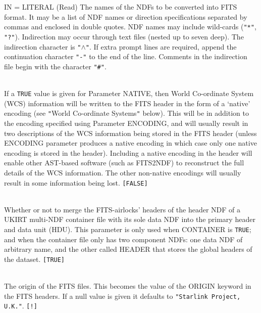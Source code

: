 \documentclass[twoside,11pt]{article}
\newcommand{\htmlref}[2]{#1}
\newcommand{\xref}[3]{#1}
\newcommand{\dqt}[1]{{\texttt{"#1"}}}
\newcommand{\hash}{\dqt{\#}}
\newcommand{\hash}{\dqt{#}}
\newcommand{\sstsubsection}[1]{ \item[{#1}] \mbox{} \\}
\newcommand{\sstsubsection}[1]{\item[{#1}]}
\begin{document}
{{{         IN = LITERAL (Read)
      }{
         The names of the NDFs to be converted into FITS format.  It
         may be a list of NDF names or direction specifications
         separated by commas and enclosed in double quotes.  
         NDF names may include wild-cards (\texttt{"*"}, \texttt{"?"}).
         Indirection may occur through text files (nested up to seven
         deep).  The indirection character is \texttt{"$\wedge$"}.  If extra
         prompt lines are required, append the continuation character
         \texttt{"-"} to the end of the line.
         Comments in the indirection file begin with the character \hash.
      }
      \sstsubsection{
         NATIVE = \_LOGICAL (Read)
      }{
         If a \texttt{TRUE} value is given for Parameter NATIVE, then World
         Co-ordinate System (WCS) information will be written to the
         FITS header in the form of a `native' encoding (see 
         \htmlref{\texttt{"}World Co-ordinate Systems\texttt{"}}
         {world_coordinate_systems} below).  This will be in addition to the
         encoding specified using Parameter ENCODING, and will usually result
         in  two descriptions of the WCS information being stored in the FITS 
         header (unless ENCODING parameter produces a native encoding in which
         case only one native encoding is stored in the header). Including a
         native encoding in the header will enable other 
         \xref{AST}{sun210}{abstract}-based software 
         (such as 
         \htmlref{FITS2NDF}{FITS2NDF}) 
         to reconstruct the full details of the WCS information. 
         The other non-native encodings will usually result in some 
         information being lost. \texttt{[FALSE]}
      }
      \sstsubsection{
         MERGE = \_LOGICAL (Read)
      }{
         Whether or not to merge the FITS-airlocks' headers of the 
         header NDF of a UKIRT multi-NDF container file with its sole 
         data NDF into the primary header and data unit (HDU).  This parameter 
         is only used when CONTAINER is \texttt{TRUE}; and when the container 
         file only has two component NDFs: one data NDF of arbitrary name, and 
         the other called HEADER that stores the global headers of the
         dataset. \texttt{[TRUE]}
      }
      \sstsubsection{
         ORIGIN = LITERAL (Read)
      }{
         The origin of the FITS files.  This becomes the value of the
         ORIGIN keyword in the FITS headers.  If a null value is given
         it defaults to \texttt{"Starlink Project, U.K."}.
         \texttt{[!]}
      }
      \sstsubsection{
}}}
\end{document}
